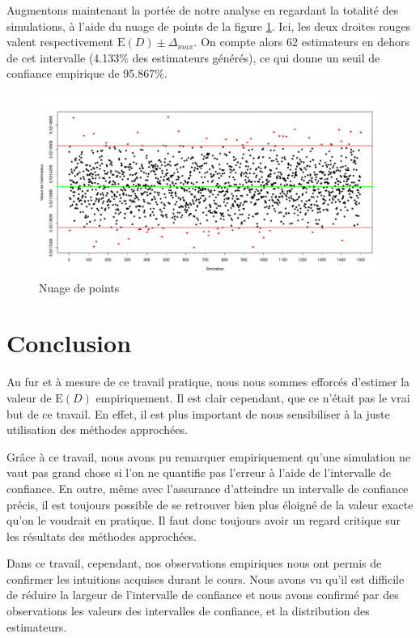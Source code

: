 \documentclass[paper=a4, fontsize=11pt]{scrartcl}
\begin{document}
Augmentons maintenant la portée de notre analyse en regardant la totalité des simulations, à l'aide du nuage de points de la figure \ref{fig:PointsCloud}. Ici, les deux droites rouges valent respectivement $\text{E}(D) \pm \Delta_{max}$. On compte alors 62 estimateurs en dehors de cet intervalle (4.133\% des estimateurs générés), ce qui donne un seuil de confiance empirique de 95.867\%.

\begin{figure}[H]
  \centering
  \includegraphics[scale=0.46]{../analysis/plots/PointsCloud.pdf}
  \caption{Nuage de points}
  \label{fig:PointsCloud}
\end{figure}

\section{Conclusion}

Au fur et à mesure de ce travail pratique, nous nous sommes efforcés d'estimer la valeur de $\text{E}(D)$ empiriquement. Il est clair cependant, que ce n'était pas le vrai but de ce travail. En effet, il est plus important de nous sensibiliser à la juste utilisation des méthodes approchées.

Grâce à ce travail, nous avons pu remarquer empiriquement qu'une simulation ne vaut pas grand chose si l'on ne quantifie pas l'erreur à l'aide de l'intervalle de confiance. En outre, même avec l'assurance d'atteindre un intervalle de confiance précis, il est toujours possible de se retrouver bien plus éloigné de la valeur exacte qu'on le voudrait en pratique. Il faut donc toujours avoir un regard critique sur les résultats des méthodes approchées.

Dans ce travail, cependant, nos observations empiriques nous ont permis de confirmer les intuitions acquises durant le cours. Nous avons vu qu'il est difficile de réduire la largeur de l'intervalle de confiance et nous avons confirmé par des observations les valeurs des intervalles de confiance, et la distribution des estimateurs.
\end{document}
